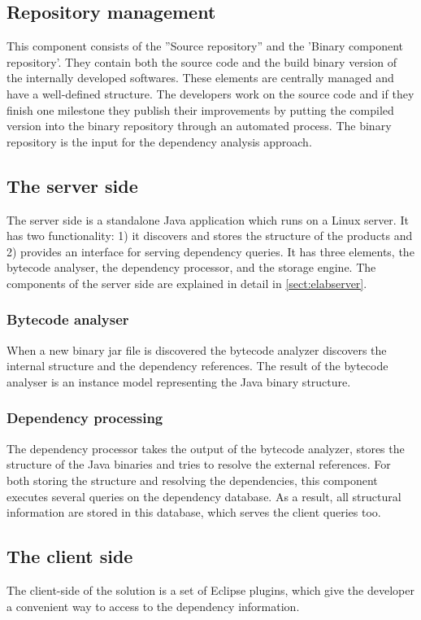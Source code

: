 \subsection{Repository management}
This component consists of the ''Source repository'' and the 'Binary component
repository'. They contain both the source code and the build binary version of
the internally developed softwares. These elements are centrally managed and
have a well-defined structure. The developers work on the source code and if
they finish one milestone they publish their improvements by putting the
compiled version into the binary repository through an automated process.
The binary repository is the input for the dependency analysis approach.

\subsection{The server side}
The server side is a standalone Java application which runs on a Linux server.
It has two functionality: 1) it discovers and stores the structure of the
products and 2) provides an interface for serving dependency queries. It has three
elements, the bytecode analyser, the dependency processor, and the storage engine.
The components of the server side are explained in detail in \autoref{sect:elabserver}.

\subsubsection{Bytecode analyser}
When a new binary jar file is discovered the bytecode analyzer  discovers the
internal structure and the dependency references. The result of the bytecode
analyser is an instance model representing the Java binary structure.

\subsubsection{Dependency processing}
The dependency processor takes the output of the bytecode analyzer, stores the 
structure of the Java binaries and tries to resolve the external references.
For both storing the structure and resolving the dependencies, this component
executes several queries on the dependency database. As a result, all structural
information are stored in this database, which serves the client queries too.


\subsection{The client side}
The client-side of the solution is a set of  Eclipse plugins, which give the
developer a convenient way to access to the dependency information. 

